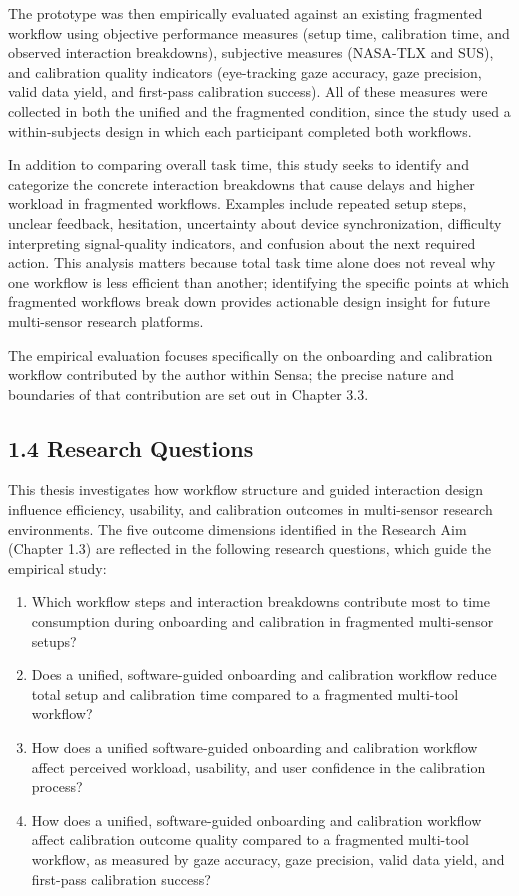 \documentclass[
]{article}
\begin{document}
The prototype was then empirically evaluated against an existing fragmented workflow using objective performance measures (setup time, calibration time, and observed interaction breakdowns), subjective measures (NASA-TLX and SUS), and calibration quality indicators (eye-tracking gaze accuracy, gaze precision, valid data yield, and first-pass calibration success). All of these measures were collected in both the unified and the fragmented condition, since the study used a within-subjects design in which each participant completed both workflows.

In addition to comparing overall task time, this study seeks to identify and categorize the concrete interaction breakdowns that cause delays and higher workload in fragmented workflows. Examples include repeated setup steps, unclear feedback, hesitation, uncertainty about device synchronization, difficulty interpreting signal-quality indicators, and confusion about the next required action. This analysis matters because total task time alone does not reveal why one workflow is less efficient than another; identifying the specific points at which fragmented workflows break down provides actionable design insight for future multi-sensor research platforms.

The empirical evaluation focuses specifically on the onboarding and calibration workflow contributed by the author within Sensa; the precise nature and boundaries of that contribution are set out in Chapter 3.3.

\hypertarget{research-questions}{%
\subsection{\texorpdfstring{1.4 Research Questions }{1.4 Research Questions }}\label{research-questions}}

This thesis investigates how workflow structure and guided interaction design influence efficiency, usability, and calibration outcomes in multi-sensor research environments. The five outcome dimensions identified in the Research Aim (Chapter 1.3) are reflected in the following research questions, which guide the empirical study:

\begin{enumerate}
\def\labelenumi{\arabic{enumi}.}
\item
  Which workflow steps and interaction breakdowns contribute most to time consumption during onboarding and calibration in fragmented multi-sensor setups?
\item
  Does a unified, software-guided onboarding and calibration workflow reduce total setup and calibration time compared to a fragmented multi-tool workflow?
\item
  How does a unified software-guided onboarding and calibration workflow affect perceived workload, usability, and user confidence in the calibration process?
\item
  How does a unified, software-guided onboarding and calibration workflow affect calibration outcome quality compared to a fragmented multi-tool workflow, as measured by gaze accuracy, gaze precision, valid data yield, and first-pass calibration success?
\end{enumerate}
\end{document}

